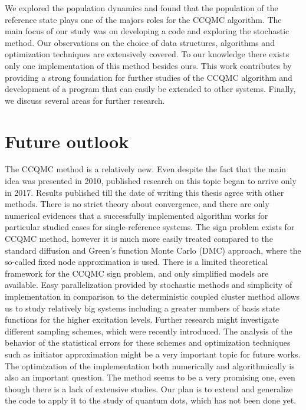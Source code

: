 \documentclass[twoside,english]{uiofysmaster}
\begin{document}
We explored the population dynamics and found that the population
of the reference state plays one of the majors roles for the CCQMC
algorithm.  The main focus of our study was on developing a code and
exploring the stochastic method.  Our observations on the choice of
data structures, algorithms and optimization techniques are
extensively covered. To our knowledge there exists only one
implementation of this method besides ours.  This work contributes by
providing a strong foundation for further studies of the CCQMC algorithm and
development of a program that can easily be extended to other systems.
Finally, we discuss several areas for further research.




\section{Future outlook}

The CCQMC method is a relatively new. Even despite the fact that the
main idea was presented in 2010, published research on this topic
began to arrive only in 2017. Results published till the date of
writing this thesis agree with other methods.  There is no strict
theory about convergence, and there are only numerical evidences that
a successfully implemented algorithm works for particular studied cases
for single-reference systems. The sign problem exists for CCQMC
method, however it is much more easily treated compared to the standard diffusion and Green's function Monte Carlo (DMC) approach,
where the so-called fixed node approximation is used. There is a limited
theoretical framework for the CCQMC sign problem, and only simplified
models are available.  Easy parallelization provided by stochastic
methods and simplicity of implementation in comparison to the
deterministic coupled cluster method allows us to study relatively big
systems including a greater numbers of basis state functions for the
higher excitation levels.  Further research might investigate
different sampling schemes\cite{ScottStochasticcoupledcluster2017},
which were recently introduced. The analysis of the behavior of the
statistical errors for these schemes and optimization techniques such
as initiator approximation might be a very important topic for future
works.  The optimization of the implementation both numerically and
algorithmically is also an important question.  The method seems to be
a very promising one, even though there is a lack of extensive studies.  Our
plan is to extend and generalize the code to apply it to the study of
quantum dots, which has not been done yet.
\end{document}
